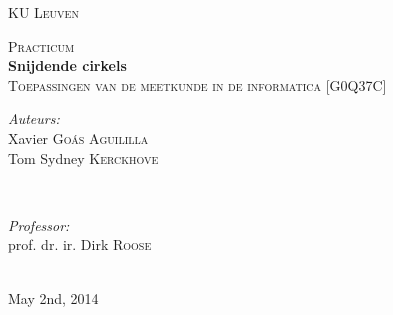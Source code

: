 \begin{titlepage}
\thispagestyle{empty}
\newcommand{\HRule}{\rule{\linewidth}{0.5mm}}
\center
\textsc{\LARGE KU Leuven}\\[1.5cm]
\vfill

\textsc{\large Practicum}\\[0.5cm]
{ \Huge \bfseries Snijdende cirkels}\\[0.4cm]
\textsc{\large Toepassingen van de meetkunde in de informatica [G0Q37C]}\\[0.5cm]
\vfill

\begin{minipage}{0.4\textwidth}
\begin{flushleft} \large
\emph{Auteurs:}\\
Xavier \textsc{Go\'as Aguililla}\\
Tom Sydney \textsc{Kerckhove}
\end{flushleft}
\end{minipage}
~
\begin{minipage}{0.4\textwidth}
\begin{flushright} \large
\emph{Professor:} \\
prof. dr. ir. Dirk \textsc{Roose}\\
\end{flushright}
\end{minipage}\\[4cm]

{\large May 2nd, 2014}\\[3cm]
\vfill

\end{titlepage}